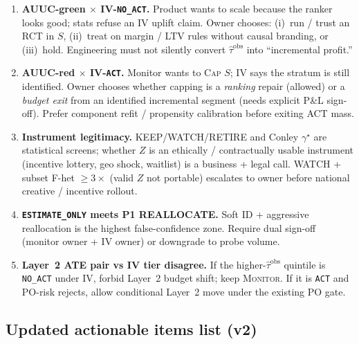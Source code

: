 \documentclass{article}
\begin{document}
\begin{enumerate}\itemsep3pt
  \item[\textbf{B1.}] \textbf{AUUC-green $\times$ IV-\texttt{NO\_ACT}.}
        Product wants to scale because the ranker looks good; stats refuse
        an IV uplift claim.
        Owner chooses: (i)~run / trust an RCT in $S$, (ii)~treat on
        margin / LTV rules without causal branding, or (iii)~hold.
        Engineering must not silently convert $\widehat{\tau}^{\mathrm{obs}}$
        into ``incremental profit.''

  \item[\textbf{B2.}] \textbf{AUUC-red $\times$ IV-\texttt{ACT}.}
        Monitor wants to \textsc{Cap} $S$; IV says the stratum is still
        identified.
        Owner chooses whether capping is a \emph{ranking} repair (allowed)
        or a \emph{budget exit} from an identified incremental segment
        (needs explicit P\&L sign-off). Prefer component refit /
        propensity calibration before exiting ACT mass.

  \item[\textbf{B3.}] \textbf{Instrument legitimacy.}
        KEEP/WATCH/RETIRE and Conley $\gamma^\star$ are statistical screens;
        whether $Z$ is an ethically / contractually usable instrument
        (incentive lottery, geo shock, waitlist) is a business + legal
        call. WATCH + subset F-het $\ge 3\times$ (valid $Z$ not portable)
        escalates to owner before national creative / incentive rollout.

  \item[\textbf{B4.}] \textbf{\texttt{ESTIMATE\_ONLY} meets P1 REALLOCATE.}
        Soft ID + aggressive reallocation is the highest false-confidence
        zone. Require dual sign-off (monitor owner + IV owner) or downgrade
        to probe volume.

  \item[\textbf{B5.}] \textbf{Layer~2 ATE pair vs IV tier disagree.}
        If the higher-$\widehat{\tau}^{\mathrm{obs}}$ quintile is
        \texttt{NO\_ACT} under IV, forbid Layer~2 budget shift; keep
        \textsc{Monitor}. If it is \texttt{ACT} and PO-risk rejects, allow
        conditional Layer~2 move under the existing PO gate.
\end{enumerate}

\subsection{Updated actionable items list (v2)}
\label{sec:actionables-v2}
\end{document}
